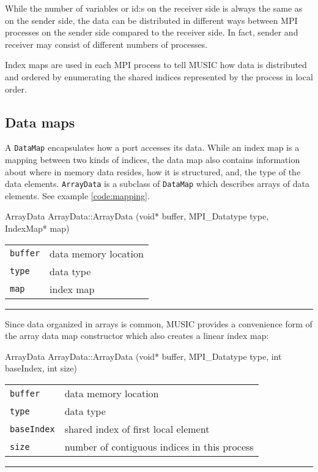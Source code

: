 \documentclass[a4paper,twoside]{report}
\makeatletter
\newenvironment{parameters}%
{\begin{tabular}{@{\hspace{2em}}lp{0.6\textwidth}}}%
{\end{tabular}\par\vspace{1mm}\par\hrule\par\vspace{5mm}}
\makeatother
\begin{document}
While the number of variables or id:s on the receiver side is always
the same as on the sender side, the data can be distributed in
different ways between MPI processes on the sender side compared to
the receiver side.  In fact, sender and receiver may consist of
different numbers of processes.

Index maps are used in each MPI process to tell MUSIC how data is
distributed and ordered by enumerating the shared indices
represented by the process in local order.

\subsection{Data maps}
\label{sec:datamap}

A \lstinline|DataMap| encapsulates how a port accesses its data.
While an index map is a mapping between two kinds of indices, the data
map also contains information about where in memory data resides, how
it is structured, and, the type of the data elements.
\lstinline|ArrayData| is a subclass of \lstinline|DataMap| which
describes arrays of data elements.  See example \ref{code:mapping}.

\begin{head}{ArrayData}
  ArrayData::ArrayData (void* buffer, MPI_Datatype type,
                        IndexMap* map)
\end{head}
\begin{parameters}
  \lstinline|buffer| & data memory location \\
  \lstinline|type|   & data type \\
  \lstinline|map|    & index map \\
\end{parameters}

Since data organized in arrays is common, MUSIC provides a convenience
form of the array data map constructor which also creates a linear
index map:

\begin{head}{ArrayData}
  ArrayData::ArrayData (void* buffer,
                        MPI_Datatype type,
                        int  baseIndex,
                        int size)
\end{head}
\begin{parameters}
  \lstinline|buffer|    & data memory location \\
  \lstinline|type|	& data type \\
  \lstinline|baseIndex| & shared index of first local element \\
  \lstinline|size|      & number of contiguous indices in this process \\
\end{parameters}
\end{document}

